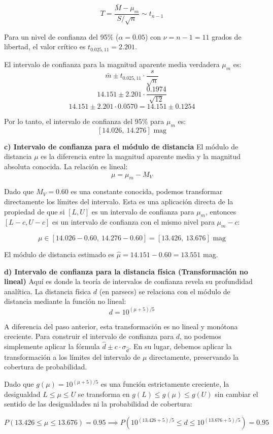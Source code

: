$$ T = \frac{\bar{M} - \mu_m}{S / \sqrt{n}} \sim t_{n-1} $$

Para un nivel de confianza del 95\% ($\alpha = 0.05$) con $\nu = n - 1 = 11$ grados de libertad, el valor crítico es $t_{0.025, 11} = 2.201$.

El intervalo de confianza para la magnitud aparente media verdadera $\mu_m$ es:
$$ \bar{m} \pm t_{0.025, 11} \cdot \frac{s}{\sqrt{n}} $$
$$ 14.151 \pm 2.201 \cdot \frac{0.1974}{\sqrt{12}} $$
$$ 14.151 \pm 2.201 \cdot 0.0570 = 14.151 \pm 0.1254 $$

Por lo tanto, el intervalo de confianza del 95\% para $\mu_m$ es:
$$ [14.026, \ 14.276] \text{ mag} $$

\textbf{c) Intervalo de confianza para el módulo de distancia}
El módulo de distancia $\mu$ es la diferencia entre la magnitud aparente media y la magnitud absoluta conocida. La relación es lineal:
$$ \mu = \mu_m - M_V $$

Dado que $M_V = 0.60$ es una constante conocida, podemos transformar directamente los límites del intervalo. Esta es una aplicación directa de la propiedad de que si $[L, U]$ es un intervalo de confianza para $\mu_m$, entonces $[L - c, U - c]$ es un intervalo de confianza con el mismo nivel para $\mu_m - c$:

$$ \mu \in [14.026 - 0.60, \ 14.276 - 0.60] = [13.426, \ 13.676] \text{ mag} $$

El módulo de distancia estimado es $\hat{\mu} = 14.151 - 0.60 = 13.551$ mag.

\textbf{d) Intervalo de confianza para la distancia física (Transformación no lineal)}
Aquí es donde la teoría de intervalos de confianza revela su profundidad analítica. La distancia física $d$ (en parsecs) se relaciona con el módulo de distancia mediante la función no lineal:
$$ d = 10^{(\mu + 5)/5} $$

A diferencia del paso anterior, esta transformación es no lineal y monótona creciente. Para construir el intervalo de confianza para $d$, no podemos simplemente aplicar la fórmula $\hat{d} \pm c \cdot \sigma_{\hat{d}}$. En su lugar, debemos aplicar la transformación a los límites del intervalo de $\mu$ directamente, preservando la cobertura de probabilidad.

Dado que $g(\mu) = 10^{(\mu+5)/5}$ es una función estrictamente creciente, la desigualdad $L \le \mu \le U$ se transforma en $g(L) \le g(\mu) \le g(U)$ sin cambiar el sentido de las desigualdades ni la probabilidad de cobertura:

$$ P(13.426 \le \mu \le 13.676) = 0.95 \implies P\left(10^{(13.426+5)/5} \le d \le 10^{(13.676+5)/5}\right) = 0.95 $$


